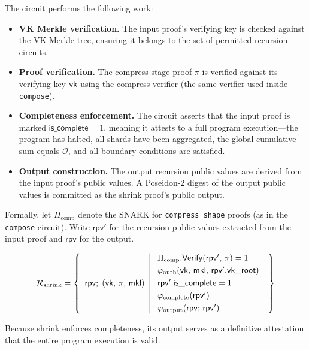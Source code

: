 \documentclass[11pt]{article}
\begin{document}
The circuit performs the following work:
\begin{itemize}
\item \textbf{VK Merkle verification.}
The input proof's verifying key is checked against the
VK Merkle tree, ensuring it belongs to the set of
permitted recursion circuits.

\item \textbf{Proof verification.}
The compress-stage proof $\pi$ is verified against its verifying key
$\mathsf{vk}$ using the compress verifier
(the same verifier used inside \texttt{compose}).

\item \textbf{Completeness enforcement.}
The circuit asserts that the input proof is marked
$\mathsf{is\_complete}=1$, meaning it attests to a full program
execution---the program has halted, all shards have been aggregated,
the global cumulative sum equals $\mathcal{O}$, and all boundary
conditions are satisfied.

\item \textbf{Output construction.}
The output recursion public values are derived from the input proof's
public values.
A Poseidon-2 digest of the output public values is committed as the
shrink proof's public output.
\end{itemize}

Formally, let $\Pi_{\mathrm{comp}}$ denote the SNARK for
\texttt{compress\_shape} proofs (as in the \texttt{compose} circuit).
Write $\mathsf{rpv}'$ for the recursion public values extracted from
the input proof and $\mathsf{rpv}$ for the output.

$$\mathcal{R}_{\mathrm{shrink}}=\left\lbrace\begin{array}{c|c}
  \mathsf{rpv}
  ;\;
  (\mathsf{vk},\,\pi,\,\mathsf{mkl})
  &
  \begin{array}{l}
  \Pi_{\mathrm{comp}}.\mathsf{Verify}(\mathsf{rpv}',\,\pi)=1\\[3pt]
  \varphi_{\mathrm{auth}}(\mathsf{vk},\,\mathsf{mkl},\,\mathsf{rpv}'.\mathsf{vk\_root})\\[3pt]
  \mathsf{rpv}'.\mathsf{is\_complete}=1\\[3pt]
  \varphi_{\mathrm{complete}}(\mathsf{rpv}')\\[3pt]
  \varphi_{\mathrm{output}}(\mathsf{rpv};\,\mathsf{rpv}')
  \end{array}
\end{array}\right\rbrace$$

\noindent
Because shrink enforces completeness, its output serves as a
definitive attestation that the entire program execution is valid.
\end{document}
